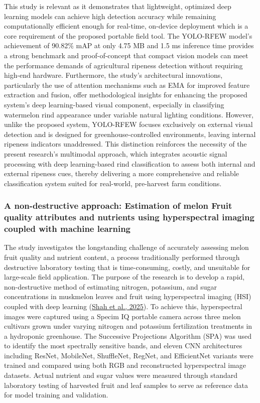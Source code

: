 \begin{thesisprose}
This study is relevant as it demonstrates that lightweight, optimized deep learning models can achieve high detection accuracy while remaining computationally efficient enough for real-time, on-device deployment which is a core requirement of the proposed portable field tool. The YOLO-RFEW model's achievement of 90.82\% mAP at only 4.75 MB and 1.5 ms inference time provides a strong benchmark and proof-of-concept that compact vision models can meet the performance demands of agricultural ripeness detection without requiring high-end hardware. Furthermore, the study's architectural innovations, particularly the use of attention mechanisms such as EMA for improved feature extraction and fusion, offer methodological insights for enhancing the proposed system's deep learning-based visual component, especially in classifying watermelon rind appearance under variable natural lighting conditions. However, unlike the proposed system, YOLO-RFEW focuses exclusively on external visual detection and is designed for greenhouse-controlled environments, leaving internal ripeness indicators unaddressed. This distinction reinforces the necessity of the present research's multimodal approach, which integrates acoustic signal processing with deep learning-based rind classification to assess both internal and external ripeness cues, thereby delivering a more comprehensive and reliable classification system suited for real-world, pre-harvest farm conditions.

\subsubsection{A non-destructive approach: Estimation of melon Fruit quality attributes and nutrients using hyperspectral imaging coupled with machine learning}

The study investigates the longstanding challenge of accurately assessing melon fruit quality and nutrient content, a process traditionally performed through destructive laboratory testing that is time-consuming, costly, and unsuitable for large-scale field application. The purpose of the research is to develop a rapid, non-destructive method of estimating nitrogen, potassium, and sugar concentrations in muskmelon leaves and fruit using hyperspectral imaging (HSI) coupled with deep learning (\hyperlink{cite.shah2025}{Shah et al., 2025}). To achieve this, hyperspectral images were captured using a Specim IQ portable camera across three melon cultivars grown under varying nitrogen and potassium fertilization treatments in a hydroponic greenhouse. The Successive Projections Algorithm (SPA) was used to identify the most spectrally sensitive bands, and eleven CNN architectures including ResNet, MobileNet, ShuffleNet, RegNet, and EfficientNet variants were trained and compared using both RGB and reconstructed hyperspectral image datasets. Actual nutrient and sugar values were measured through standard laboratory testing of harvested fruit and leaf samples to serve as reference data for model training and validation.


\end{thesisprose}
